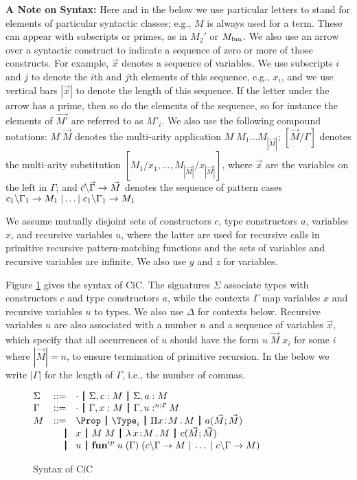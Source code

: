 \documentclass{article}
\begin{document}
\textbf{A Note on Syntax:} Here and in the below we use particular
letters to stand for elements of particular syntactic classes; e.g.,
$M$ is always used for a term. These can appear with subscripts or
primes, as in $M_2'$ or $M_{\mathrm{fun}}$. We also use an arrow over a syntactic
construct to indicate a sequence of zero or more of those constructs.
For example, $\vec{x}$ denotes a sequence of variables. We use
subscripts $i$ and $j$ to denote the $i$th and $j$th elements of this
sequence, e.g., $x_i$, and we use vertical bars $|\vec{x}|$ to denote
the length of this sequence. If the letter under the arrow has a
prime, then so do the elements of the sequence, so for instance the
elements of $\vec{M'}$ are referred to as $M'_i$.  We also use the
following compound notations: $M\;\vec{M}$ denotes the multi-arity
application $M\;M_1\ldots M_{|\vec{M}|}$; $[\vec{M}/\Gamma]$ denotes
the multi-arity substitution
$[M_1/x_1,\ldots,M_{|\vec{M}|}/x_{|\vec{M}|}]$, where $\vec{x}$ are
the variables on the left in $\Gamma$; and
$\vec{c} \backslash \vec{\Gamma} \to \vec{M}$ denotes the sequence of pattern
cases $c_1 \backslash \Gamma_1 \to M_1\;|\ldots|\;c_1 \backslash \Gamma_1 \to M_1$

We assume mutually disjoint sets of constructors $c$, type
constructors $a$, variables $x$, and recursive variables $u$, where
the latter are used for recursive calls in primitive recursive
pattern-matching functions and the sets of variables and recursive
variables are infinite. We also use $y$ and $z$ for variables.

Figure \ref{fig:syntax} gives the syntax of CiC. The signatures
$\Sigma$ associate types with constructors $c$ and type constructors
$a$, while the contexts $\Gamma$ map variables $x$ and recursive
variables $u$ to types. We also use $\Delta$ for contexts below.
Recursive variables $u$ are also associated
with a number $n$ and a sequence of variables $\vec{x}$, which specify
that all occurrences of $u$ should have the form $u\;\vec{M}\;x_i$ for
some $i$ where $|\vec{M}|=n$, to ensure termination of primitive
recursion. In the below we write $|\Gamma|$ for the length of
$\Gamma$, i.e., the number of commas.


\begin{figure}
\centering
\iftechreport\else\begin{small}\fi
\begin{math}
\begin{array}{@{}lrl@{}}
\Sigma & ::= & \cdot \bor \Sigma,c:M \bor \Sigma,a:M\\
\Gamma & ::= & \cdot \bor \Gamma,\gxform{M} \bor \Gamma,\guform{n}{\vec{x}}{M}\\
M & ::= & \Prop \bor \Type_i \bor \pitype{x}{M}{M}
\bor \ctorapp{a}{\vec{M}}{\vec{M}}\\
& \borstar & x \bor M\;M \bor \lamabs{x}{M}{M} \bor \ctorapp{c}{\vec{M}}{\vec{M}}\\
& \borstar & u \bor \pmfun[ip]{u}{\Gamma}{\pc{c}{\Gamma}{M}\;|\;\ldots\;|\;\pc{c}{\Gamma}{M}}
\end{array}
\end{math}
\iftechreport\else\end{small}\fi
\caption{Syntax of CiC}
\label{fig:syntax}
\end{figure}
\end{document}
